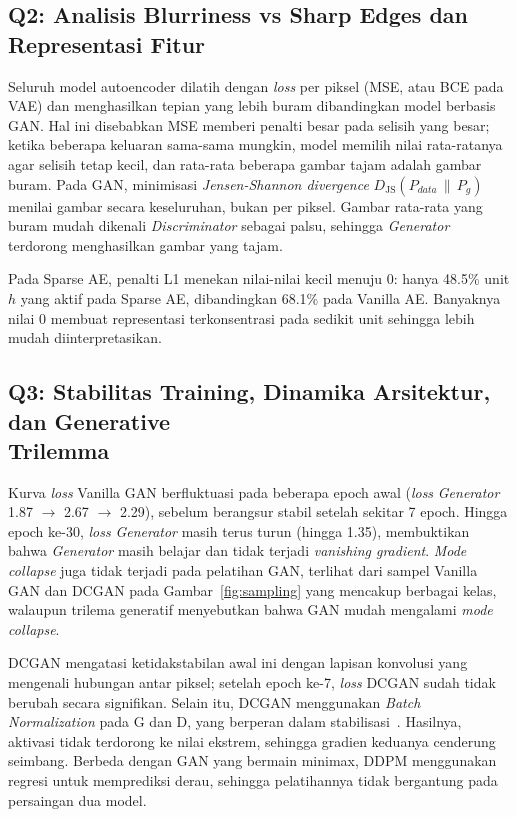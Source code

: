 \documentclass{article}
\begin{document}
\subsection{Q2: Analisis Blurriness vs Sharp Edges dan Representasi Fitur}
Seluruh model autoencoder dilatih dengan \textit{loss} per piksel (MSE, atau BCE pada VAE) dan menghasilkan tepian yang lebih buram dibandingkan model berbasis GAN. Hal ini disebabkan MSE memberi penalti besar pada selisih yang besar; ketika beberapa keluaran sama-sama mungkin, model memilih nilai rata-ratanya agar selisih tetap kecil, dan rata-rata beberapa gambar tajam adalah gambar buram.
Pada GAN, minimisasi \textit{Jensen-Shannon divergence} $D_\text{JS}(P_{data}\,\|\,P_g)$~\cite{goodfellow2014} menilai gambar secara keseluruhan, bukan per piksel. Gambar rata-rata yang buram mudah dikenali \textit{Discriminator} sebagai palsu, sehingga \textit{Generator} terdorong menghasilkan gambar yang tajam.

Pada Sparse AE, penalti L1 menekan nilai-nilai kecil menuju 0: hanya 48.5\% unit $h$ yang aktif pada Sparse AE, dibandingkan 68.1\% pada Vanilla AE. Banyaknya nilai 0 membuat representasi terkonsentrasi pada sedikit unit sehingga lebih mudah diinterpretasikan.

\subsection{Q3: Stabilitas Training, Dinamika Arsitektur, dan Generative\\ Trilemma}
Kurva \textit{loss} Vanilla GAN berfluktuasi pada beberapa epoch awal (\textit{loss} \textit{Generator} 1.87 $\to$ 2.67 $\to$ 2.29), sebelum berangsur stabil setelah sekitar 7 epoch. Hingga epoch ke-30, \textit{loss} \textit{Generator} masih terus turun (hingga 1.35), membuktikan bahwa \textit{Generator} masih belajar dan tidak terjadi \textit{vanishing gradient}. \textit{Mode collapse} juga tidak terjadi pada pelatihan GAN, terlihat dari sampel Vanilla GAN dan DCGAN pada Gambar~\ref{fig:sampling} yang mencakup berbagai kelas, walaupun trilema generatif menyebutkan bahwa GAN mudah mengalami \textit{mode collapse}.

DCGAN mengatasi ketidakstabilan awal ini dengan lapisan konvolusi yang mengenali hubungan antar piksel; setelah epoch ke-7, \textit{loss} DCGAN sudah tidak berubah secara signifikan. Selain itu, DCGAN menggunakan \textit{Batch Normalization} pada G dan D, yang berperan dalam stabilisasi~\cite{radford2016}. Hasilnya, aktivasi tidak terdorong ke nilai ekstrem, sehingga gradien keduanya cenderung seimbang. Berbeda dengan GAN yang bermain minimax, DDPM menggunakan regresi untuk memprediksi derau, sehingga pelatihannya tidak bergantung pada persaingan dua model.
\end{document}
